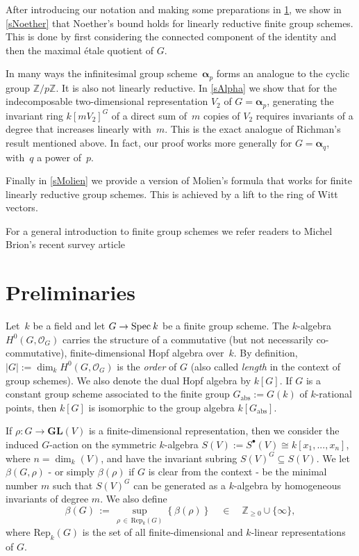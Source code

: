 \documentclass[reqno]{amsart}
\newcommand{\ZZ}{{\mathbb{Z}}}
\newcommand{\Spec}{{\rm Spec}\:}
\newcommand{\GL}{{\mathbf{GL}}}
\newcommand{\OO}{{\mathcal O}}
\newcommand{\balpha}{\boldsymbol{\alpha}}
\theoremstyle{definition}
\theoremstyle{plain}
\begin{document}
After introducing our notation and making some preparations in \cref{SPrelim}, 
we show in \cref{sNoether} that Noether's bound holds for linearly reductive finite group schemes. This is done
by first considering the connected component of the identity and then the maximal \'etale quotient of $G$.

In many ways the infinitesimal group scheme~$\balpha_p$ forms an analogue to the cyclic group $\ZZ/p\ZZ$. It is also not
linearly reductive. In \cref{sAlpha} we show that for the indecomposable two-dimensional representation $V_2$ of
$G = \balpha_p$, generating the invariant ring $k[m V_2]^G$ of a direct sum of~$m$ copies of $V_2$ requires invariants
of a degree that increases linearly with~$m$. This is the exact analogue of Richman's result mentioned above. In fact,
our proof works more generally for $G = \balpha_q$, with~$q$ a power of~$p$.

Finally in \cref{sMolien} we provide a version of Molien's formula that works for finite linearly reductive group schemes.
This is achieved by a lift to the ring of Witt vectors.

For a general introduction to finite group schemes we refer readers to Michel Brion's 
recent survey article
\cite{Brion}

\section{Preliminaries} \label{SPrelim}

Let~$k$ be a field and let $G\to\Spec k$ be a finite group scheme.
The $k$-algebra $H^0(G,\OO_G)$ carries the structure of a commutative
(but not necessarily co-com\-mu\-ta\-tive), finite-dimensional Hopf algebra over~$k$.
By definition, $|G|:=\dim_k H^0(G,\OO_G)$ is the \emph{order} of $G$ (also called \emph{length} in the context of group schemes).
We also denote the dual Hopf algebra by $k[G]$.
If $G$ is a constant group scheme associated to the finite group $G_{\mathrm{abs}}:=G(k)$
of $k$-rational points, then $k[G]$ is isomorphic to the group algebra $k[G_{\mathrm{abs}}]$.

If $\rho:G\to\GL(V)$ is a finite-dimensional representation,
then we consider the induced
$G$-action on the symmetric $k$-algebra $S(V):=S^\bullet(V)\cong k[x_1,...,x_n]$,
where $n=\dim_k(V)$, and have the invariant subring $S(V)^G\subseteq S(V)$.
We let $\beta(G,\rho)$ - or simply $\beta(\rho)$ if $G$ is clear from the context -
be the minimal number $m$ such that $S(V)^G$
can be generated as a $k$-algebra by homogeneous
invariants of degree $m$.
We also define
$$
\beta(G) \,:=\,\sup_{\rho\,\in\,\mathrm{Rep}_k(G)}\left\{ \beta(\rho) \right\}
\quad\in\quad\ZZ_{\geq0}\cup\{\infty\},
$$
where $\mathrm{Rep}_k(G)$ is the set of all finite-dimensional and $k$-linear representations of $G$.
\end{document}
